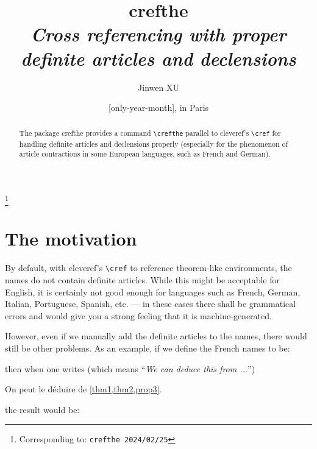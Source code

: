 \documentclass[classical]{einfart}
\newcommand{\crefthepackage}{\textsf{crefthe}}
\begin{document}
\def\PackageVersion{2024/02/25}
\def\PackageSubVersion{}

\title{\crefthepackage{}\\\smallskip\itshape Cross referencing with proper definite articles and declensions}
\author{Jinwen XU}
\thanks{Corresponding to: \texttt{\crefthepackage{} \PackageVersion\PackageSubVersion}}
\date{\TheDate{\PackageVersion}[only-year-month], in Paris}

\maketitle

\begin{abstract}
    \raggedleft
    The package \crefthepackage{} provides a command \lstinline|\crefthe| parallel to \textsf{cleveref}'s \lstinline|\cref| for handling definite articles and declensions properly (especially for the phenomenon of article contractions in some European languages, such as French and German).
\end{abstract}

\section{The motivation}

By default, with \textsf{cleveref}'s \lstinline|\cref| to reference theorem-like environments, the names do not contain definite articles. While this might be acceptable for English, it is certainly not good enough for languages such as French, German, Italian, Portuguese, Spanish, etc. --- in these cases there shall be grammatical errors and would give you a strong feeling that it is machine-generated.

However, even if we manually add the definite articles to the names, there would still be other problems. As an example, if we define the French names to be:

\begin{code}
\end{code}

then when one writes (which means ``\emph{We can deduce this from ...}'')

\begin{code}
On peut le déduire de \cref{thm1,thm2,prop3}.
\end{code}

the result would be:
\end{document}
